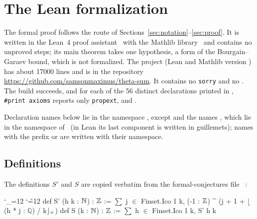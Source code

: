 \makeatletter
\newenvironment{leancode}{%
  \trivlist\item\relax
  \leftskip\@totalleftmargin\rightskip\z@skip
  \parindent\z@\parfillskip\@flushglue\parskip\z@skip
  \@@par
  \@tempswafalse
  \def\par{%
    \if@tempswa
      \leavevmode\null\@@par\penalty\interlinepenalty
    \else
      \@tempswatrue
      \ifhmode\@@par\penalty\interlinepenalty\fi
    \fi}%
  \ttfamily\small\frenchspacing\@noligs
  \catcode`\_=12 \catcode`\^=12
  \obeylines\@vobeyspaces}{\endtrivlist}
\makeatother

\section{The Lean formalization}\label{app:lean}

The formal proof follows the route of Sections~\ref{sec:notation}--\ref{sec:proof}. It is written in the Lean~4 proof assistant~\cite{b35} with the Mathlib library~\cite{b34} and contains no unproved steps; its main theorem takes one hypothesis, a form of the Bourgain--Garaev bound, which is not formalized. The project (Lean and Mathlib version ) has about 17000 lines and is in the repository \url{https://github.com/samsonmaximus/theta-sum}. It contains no \texttt{sorry} and no . The build succeeds, and for each of the 56 distinct declarations printed in , \texttt{\#print axioms} reports only \texttt{propext},  and .

Declaration names below lie in the namespace , except  and the names , which lie in the namespace  of~\cite{b11} (in Lean its last component is written in guillemets); names with the prefix  or  are written with their namespace.

\subsection*{Definitions}
The definitions $S'$ and $S$ are copied verbatim from the formal-conjectures file ~\cite{b11}:
\begin{leancode}
def S' (h k : $\mathbb{N}$) : $\mathbb{Z}$ :=
  $\sum$ j $\in$ Finset.Ico 1 k, (-1 : $\mathbb{Z}$) ^ (j + 1 + $\lfloor$(h * j : $\mathbb{Q}$) / k$\rfloor\sb{+}$)
def S (k : $\mathbb{N}$) : $\mathbb{Z}$ := $\sum$ h $\in$ Finset.Ico 1 k, S' h k
\end{leancode}

